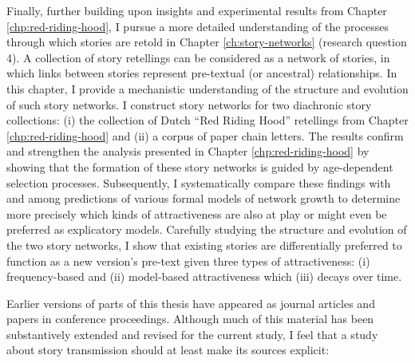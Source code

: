 Finally, further building upon insights and experimental results from Chapter \ref{chp:red-riding-hood}, I pursue a more detailed understanding of the processes through which stories are retold in Chapter \ref{ch:story-networks} (research question 4). A collection of story retellings can be considered as a network of stories, in which links between stories represent pre-textual (or ancestral) relationships. In this chapter, I provide a mechanistic understanding of the structure and evolution of such story networks. I construct story networks for two diachronic story collections: (i) the collection of Dutch ``Red Riding Hood'' retellings from Chapter \ref{chp:red-riding-hood} and (ii) a corpus of paper chain letters. The results confirm and strengthen the analysis presented in Chapter \ref{chp:red-riding-hood} by showing that the formation of these story networks is guided by age-dependent selection processes. Subsequently, I systematically compare these findings with and among predictions of various formal models of network growth to determine more precisely which kinds of attractiveness are also at play or might even be preferred as explicatory models. Carefully studying the structure and evolution of the two story networks, I show that existing stories are differentially preferred to function as a new version's pre-text given three types of attractiveness: (i) frequency-based and (ii) model-based attractiveness which (iii) decays over time.

Earlier versions of parts of this thesis have appeared as journal articles and papers in conference proceedings. Although much of this material has been substantively extended and revised for the current study, I feel that a study about story transmission should at least make its sources explicit:

\begin{refsection}
\nocite{karsdorp:2012,karsdorp:2012b,karsdorp:2013,Karsdorp:2013tk,karsdorp:2015a,karsdorp:2015b,karsdorp:story-networks,folgert_karsdorp_2016_51588} %
\printbibliography[heading=none, keyword=mywork]
\end{refsection}